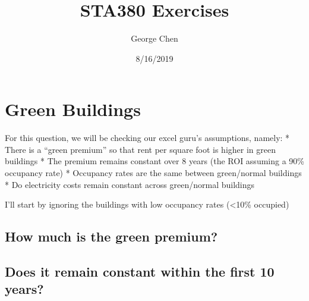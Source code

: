 \documentclass[]{article}
\title{STA380 Exercises}
\author{George Chen}
\date{8/16/2019}
\newenvironment{Shaded}{\begin{snugshade}}{\end{snugshade}}
\newcommand{\DataTypeTok}[1]{\textcolor[rgb]{0.13,0.29,0.53}{#1}}
\newcommand{\DecValTok}[1]{\textcolor[rgb]{0.00,0.00,0.81}{#1}}
\newcommand{\KeywordTok}[1]{\textcolor[rgb]{0.13,0.29,0.53}{\textbf{#1}}}
\newcommand{\NormalTok}[1]{#1}
\newcommand{\OperatorTok}[1]{\textcolor[rgb]{0.81,0.36,0.00}{\textbf{#1}}}
\newcommand{\OtherTok}[1]{\textcolor[rgb]{0.56,0.35,0.01}{#1}}
\newcommand{\StringTok}[1]{\textcolor[rgb]{0.31,0.60,0.02}{#1}}
\begin{document}
\maketitle

\hypertarget{green-buildings}{%
\section{Green Buildings}\label{green-buildings}}

For this question, we will be checking our excel guru's assumptions,
namely: * There is a ``green premium'' so that rent per square foot is
higher in green buildings * The premium remains constant over 8 years
(the ROI assuming a 90\% occupancy rate) * Occupancy rates are the same
between green/normal buildings * Do electricity costs remain constant
across green/normal buildings

I'll start by ignoring the buildings with low occupancy rates
(\textless{}10\% occupied)

\begin{Shaded}
\end{Shaded}

\hypertarget{how-much-is-the-green-premium}{%
\subsection{How much is the green
premium?}\label{how-much-is-the-green-premium}}

\hypertarget{does-it-remain-constant-within-the-first-10-years}{%
\subsection{Does it remain constant within the first 10
years?}\label{does-it-remain-constant-within-the-first-10-years}}
\end{document}
